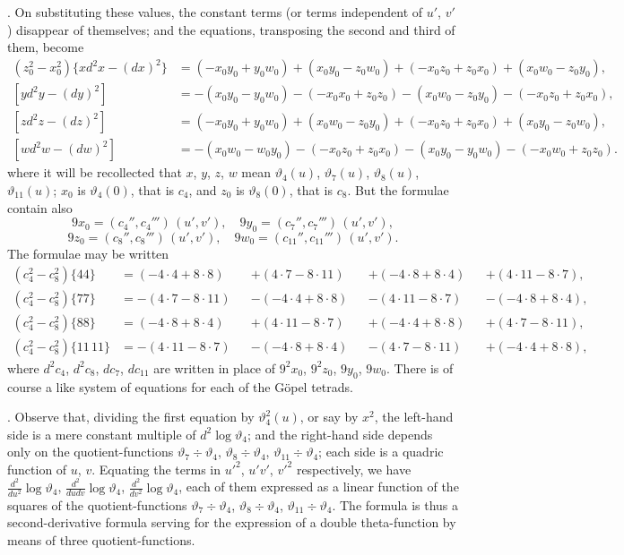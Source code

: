 \documentclass[11pt,a4paper]{book}
\begin{document}
. On substituting these values, the constant terms (or terms independent of $u'$, $v'$) disappear of themselves; and the equations, transposing the second and third of them, become
\[
\begin{aligned}
(z_0^2 - x_0^2)\{xd^2x - (dx)^2\} &= (-x_0 y_0 + y_0 w_0) + (x_0 y_0 - z_0 w_0) + (-x_0 z_0 + z_0 x_0) + (x_0 w_0 - z_0 y_0),\\
[yd^2y - (dy)^2] &= -(x_0 y_0 - y_0 w_0) - (-x_0 x_0 + z_0 z_0) - (x_0 w_0 - z_0 y_0) - (-x_0 z_0 + z_0 x_0),\\
[zd^2z - (dz)^2] &= (-x_0 y_0 + y_0 w_0) + (x_0 w_0 - z_0 y_0) + (-x_0 z_0 + z_0 x_0) + (x_0 y_0 - z_0 w_0),\\
[wd^2w - (dw)^2] &= -(x_0 w_0 - w_0 y_0) - (-x_0 z_0 + z_0 x_0) - (x_0 y_0 - y_0 w_0) - (-x_0 w_0 + z_0 z_0).
\end{aligned}
\]
where it will be recollected that $x$, $y$, $z$, $w$ mean $\vartheta_4(u)$, $\vartheta_7(u)$, $\vartheta_8(u)$, $\vartheta_{11}(u)$; $x_0$ is $\vartheta_4(0)$, that is $c_4$, and $z_0$ is $\vartheta_8(0)$, that is $c_8$. But the formulae contain also
\[
9x_0 = (c_4'', c_4''') \, (u', v'),\quad 9y_0 = (c_7'', c_7''') \, (u', v'),
\]
\[
9z_0 = (c_8'', c_8''') \, (u', v'),\quad 9w_0 = (c_{11}'', c_{11}''') \, (u', v').
\]
The formulae may be written
\[
\begin{aligned}
(c_4^2 - c_8^2)\{44\} &= (-4 \cdot 4 + 8 \cdot 8) &&+ (4 \cdot 7 - 8 \cdot 11) &&+ (-4 \cdot 8 + 8 \cdot 4) &&+ (4 \cdot 11 - 8 \cdot 7),\\
(c_4^2 - c_8^2)\{77\} &= -(4 \cdot 7 - 8 \cdot 11) &&- (-4 \cdot 4 + 8 \cdot 8) &&- (4 \cdot 11 - 8 \cdot 7) &&- (-4 \cdot 8 + 8 \cdot 4),\\
(c_4^2 - c_8^2)\{88\} &= (-4 \cdot 8 + 8 \cdot 4) &&+ (4 \cdot 11 - 8 \cdot 7) &&+ (-4 \cdot 4 + 8 \cdot 8) &&+ (4 \cdot 7 - 8 \cdot 11),\\
(c_4^2 - c_8^2)\{11\,11\} &= -(4 \cdot 11 - 8 \cdot 7) &&- (-4 \cdot 8 + 8 \cdot 4) &&- (4 \cdot 7 - 8 \cdot 11) &&+ (-4 \cdot 4 + 8 \cdot 8),
\end{aligned}
\]
where $d^2c_4$, $d^2c_8$, $dc_7$, $dc_{11}$ are written in place of $9^2x_0$, $9^2z_0$, $9y_0$, $9w_0$. There is of course a like system of equations for each of the G\"opel tetrads.

\newpage
\setcounter{page}{560}

. Observe that, dividing the first equation by $\vartheta_4^2(u)$, or say by $x^2$, the left-hand side is a mere constant multiple of $d^2 \log \vartheta_4$; and the right-hand side depends only on the quotient-functions $\vartheta_7 \div \vartheta_4$, $\vartheta_8 \div \vartheta_4$, $\vartheta_{11} \div \vartheta_4$; each side is a quadric function of $u$, $v$. Equating the terms in $u'^2$, $u'v'$, $v'^2$ respectively, we have $\frac{d^2}{du^2} \log \vartheta_4$, $\frac{d^2}{dudv} \log \vartheta_4$, $\frac{d^2}{dv^2} \log \vartheta_4$, each of them expressed as a linear function of the squares of the quotient-functions $\vartheta_7 \div \vartheta_4$, $\vartheta_8 \div \vartheta_4$, $\vartheta_{11} \div \vartheta_4$. The formula is thus a second-derivative formula serving for the expression of a double theta-function by means of three quotient-functions.
\end{document}
